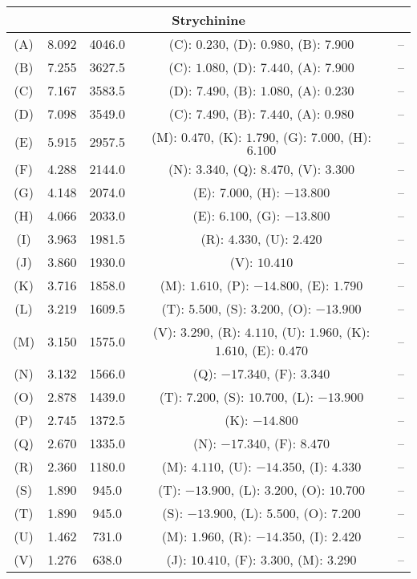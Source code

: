 \begin{longtable}[h!]{c c c c c}
\hline
\multicolumn{5}{c}{\textbf{Strychinine}}\\
\hline
(A) & 8.092 & 4046.0 & (C): $0.230$, (D): $0.980$, (B): $7.900$& -- \\
(B) & 7.255 & 3627.5 & (C): $1.080$, (D): $7.440$, (A): $7.900$& -- \\
(C) & 7.167 & 3583.5 & (D): $7.490$, (B): $1.080$, (A): $0.230$& -- \\
(D) & 7.098 & 3549.0 & (C): $7.490$, (B): $7.440$, (A): $0.980$& -- \\
(E) & 5.915 & 2957.5 & (M): $0.470$, (K): $1.790$, (G): $7.000$, (H): $6.100$& -- \\
(F) & 4.288 & 2144.0 & (N): $3.340$, (Q): $8.470$, (V): $3.300$& -- \\
(G) & 4.148 & 2074.0 & (E): $7.000$, (H): $-13.800$& -- \\
(H) & 4.066 & 2033.0 & (E): $6.100$, (G): $-13.800$& -- \\
(I) & 3.963 & 1981.5 & (R): $4.330$, (U): $2.420$& -- \\
(J) & 3.860 & 1930.0 & (V): $10.410$& -- \\
(K) & 3.716 & 1858.0 & (M): $1.610$, (P): $-14.800$, (E): $1.790$& -- \\
(L) & 3.219 & 1609.5 & (T): $5.500$, (S): $3.200$, (O): $-13.900$& -- \\
(M) & 3.150 & 1575.0 & (V): $3.290$, (R): $4.110$, (U): $1.960$, (K): $1.610$, (E): $0.470$& -- \\
(N) & 3.132 & 1566.0 & (Q): $-17.340$, (F): $3.340$& -- \\
(O) & 2.878 & 1439.0 & (T): $7.200$, (S): $10.700$, (L): $-13.900$& -- \\
(P) & 2.745 & 1372.5 & (K): $-14.800$& -- \\
(Q) & 2.670 & 1335.0 & (N): $-17.340$, (F): $8.470$& -- \\
(R) & 2.360 & 1180.0 & (M): $4.110$, (U): $-14.350$, (I): $4.330$& -- \\
(S) & 1.890 & 945.0 & (T): $-13.900$, (L): $3.200$, (O): $10.700$& -- \\
(T) & 1.890 & 945.0 & (S): $-13.900$, (L): $5.500$, (O): $7.200$& -- \\
(U) & 1.462 & 731.0 & (M): $1.960$, (R): $-14.350$, (I): $2.420$& -- \\
(V) & 1.276 & 638.0 & (J): $10.410$, (F): $3.300$, (M): $3.290$& -- \\

\hline
\end{longtable}
